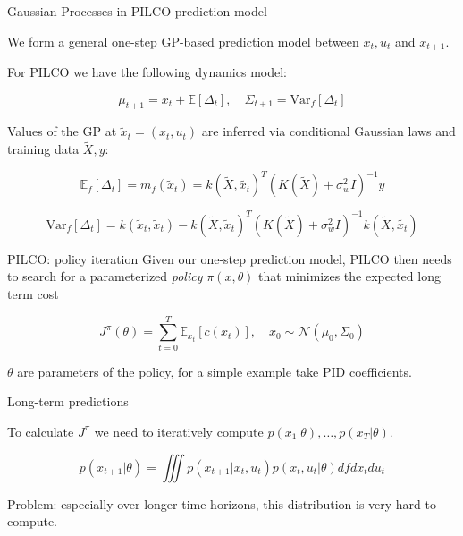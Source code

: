 \documentclass{beamer}
\begin{document}
\begin{frame}{Gaussian Processes in PILCO prediction model}
	
	We form a general one-step GP-based prediction model between $x_t, u_t$ and $x_{t+1}$.
	
	For PILCO we have the following dynamics model: 
	
	$$ \mu_{t+1} = x_t + \mathbb{E}[\Delta_t], \quad \Sigma_{t+1} = \text{Var}_{f}[\Delta_t] $$
	
	Values of the GP at $\tilde{x}_t = (x_t, u_t)$ are inferred via conditional Gaussian laws and training data $\tilde{X}, y$: 
	
	$$ \mathbb{E}_f[\Delta_t] = m_f(\tilde{x}_t) = k(\tilde{X}, \tilde{x_t})^T(K(\tilde{X}) + \sigma^2_w I)^{-1}y$$
	
	$$ \text{Var}_f[\Delta_t] = k(\tilde{x}_t, \tilde{x}_t) - k(\tilde{X}, \tilde{x}_t)^{T}(K(\tilde{X}) + \sigma_w^2 I)^{-1} k(\tilde{X}, \tilde{x_t}) $$
	
	
	
\end{frame}
\begin{frame}{PILCO: policy iteration}
	Given our one-step prediction model, PILCO then needs to search for a parameterized \textit{policy} $\pi(x, \theta)$ that minimizes the expected long term cost
	
	$$ J^{\pi}(\theta) = \sum_{t=0}^{T} \mathbb{E}_{x_t}[c(x_t)], \quad x_0 \sim \mathcal{N}(\mu_0, \Sigma_0) $$
	
	$\theta$ are parameters of the policy, for a simple example take PID coefficients.
\end{frame}
\begin{frame}{Long-term predictions}
	
	To calculate $J^\pi$ we need to iteratively compute $p(x_1|\theta), \ldots, p(x_T|\theta)$.
	
	$$ p(x_{t+1}|\theta) = \iiint p(x_{t+1}|x_t, u_t) p(x_t, u_t|\theta) df dx_t du_t $$
	
	Problem: especially over longer time horizons, this distribution is very hard to compute. 
\end{frame}
\end{document}
